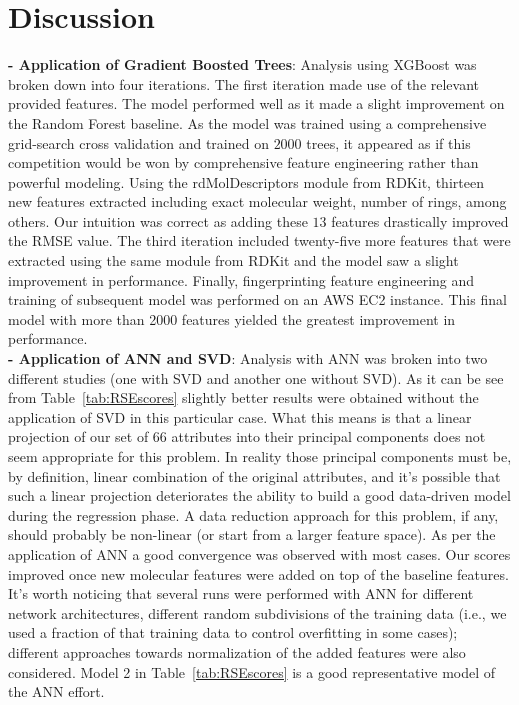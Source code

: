\documentclass{article}
\begin{document}

\section{Discussion}

\textbf{- Application of Gradient Boosted Trees}: Analysis using XGBoost was broken down into four iterations. The first iteration made use of the relevant provided features. The model performed well as it made a slight improvement on the Random Forest baseline. As the model was trained using a comprehensive grid-search cross validation and trained on $2000$ trees, it appeared as if this competition would be won by comprehensive feature engineering rather than powerful modeling. Using the rdMolDescriptors module from RDKit, thirteen new features extracted including exact molecular weight, number of rings, among others. Our intuition was correct as adding these $13$ features drastically improved the RMSE value. The third iteration included twenty-five more features that were extracted using the same module from RDKit and the model saw a slight improvement in performance. Finally, fingerprinting feature engineering and training of subsequent model was performed on an AWS EC2 instance. This final model with more than 2000 features yielded the greatest improvement in performance.\\

\textbf{- Application of ANN and SVD}: Analysis with ANN was broken into two different studies (one with SVD and another one without SVD). As it can be see from Table~\ref{tab:RSEscores} slightly better results were obtained without the application of SVD in this particular case. What this means is that a linear projection of our set of 66 attributes into their principal components does not seem appropriate for this problem. In reality those principal components must be, by definition, linear combination of the original attributes, and it's possible that such a linear projection deteriorates the ability to build a good data-driven model during the regression phase. A data reduction approach for this problem, if any, should probably be non-linear (or start from a larger feature space). As per the application of ANN a good convergence was observed with most cases. Our scores improved once new molecular features were added on top of the baseline features. It's worth noticing that several runs were performed with ANN for different network architectures, different random subdivisions of the training data (i.e., we used a fraction of that training data to control overfitting in some cases); different approaches towards normalization of the added features were also considered. Model 2 in Table~\ref{tab:RSEscores} is a good representative model of the ANN effort. \\
\end{document}
